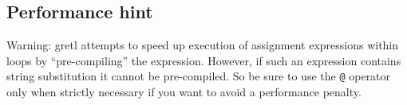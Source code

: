 \subsection{Performance hint}

Warning: gretl attempts to speed up execution of assignment
expressions within loops by ``pre-compiling'' the expression.
However, if such an expression contains string substitution it cannot
be pre-compiled. So be sure to use the \verb|@| operator only when
strictly necessary if you want to avoid a performance penalty.


\label{LastPage}

